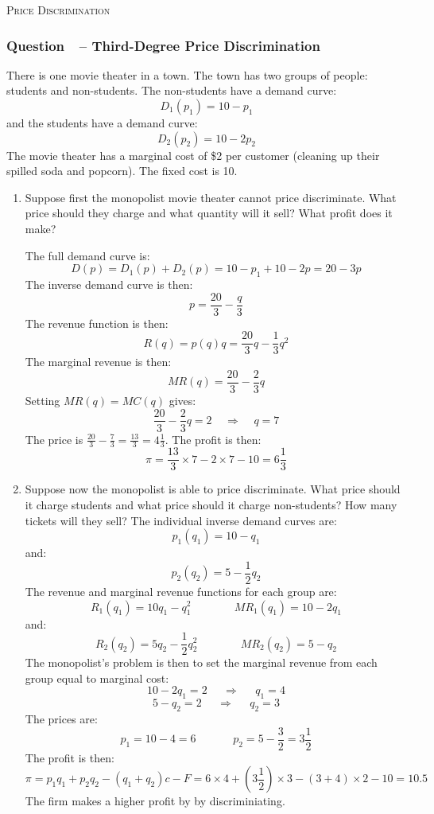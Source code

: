 \documentclass[12pt]{article}
\newcommand{\topic}[1]{\medskip\begin{center}\large\textsc{#1}\normalsize
  \end{center}}
\newcounter{question}[section]
\newcommand{\question}[1]{\refstepcounter{question}
  \subsubsection*{Question~\thequestion~-- #1}}
\newenvironment{subquestions}{
  \begin{enumerate}[label=(\roman*)]}{\end{enumerate}}
\begin{document}
\topic{Price Discrimination}

\question{Third-Degree Price Discrimination}
There is one movie theater in a town. The town has two groups of people:
students and non-students. The non-students have a demand curve:
\[
  D_1\left( p_1\right) = 10-p_1
\]
and the students have a demand curve:
\[
  D_2\left( p_2 \right) = 10 - 2p_2
\]
The movie theater has a marginal cost of \$2 per customer (cleaning up their
spilled soda and popcorn). The fixed cost is 10.
\begin{subquestions}
  \item Suppose first the monopolist movie theater cannot price discriminate.
    What price should they charge and what quantity will it sell? What
    profit does it make?

    \textcolor{solution-color}{
      The full demand curve is:
      \[
        D\left( p\right)=D_1\left( p \right)+D_2\left( p \right)=10-p_1 + 10 -
        2p = 20-3p
      \]
      The inverse demand curve is then:
      \[
        p=\frac{20}{3}-\frac{q}{3}
      \]
      The revenue function is then:
      \[
        R\left( q \right)=p\left( q \right)q=\frac{20}{3}q -
        \frac{1}{3}q^2
      \]
      The marginal revenue is then:
      \[
        MR\left( q \right)=\frac{20}{3}-\frac{2}{3}q
      \]
      Setting $MR\left( q \right)=MC\left( q \right)$ gives:
      \[
        \frac{20}{3}-\frac{2}{3}q=2 \;\;\;\;\Longrightarrow \;\;\;\;
        q = 7
      \]
      The price is
      $\frac{20}{3}-\frac{7}{3}=\frac{13}{3}=4\frac{1}{3}$.
      The profit is then:
      \[
        \pi=\frac{13}{3}\times 7  - 2\times 7 - 10 = 6\frac{1}{3}
      \]
    }
  \item Suppose now the monopolist is able to price discriminate. What price
    should it charge students and what price should it charge non-students?
    How many tickets will they sell?
    \textcolor{solution-color}{
      The individual inverse demand curves are:
      \[
        p_1\left( q_1 \right)=10-q_1
      \]
      and:
      \[
        p_2\left( q_2 \right)=5-\frac{1}{2}q_2
      \]
      The revenue and marginal revenue functions for each group are:
      \[
        R_1\left( q_1 \right)=10q_1-q_1^2 \;\;\;\;\;\;\;\;\;\;\;\;\;\;
        MR_1\left( q_1 \right)=10-2q_1
      \]
      and:
      \[
        R_2\left( q_2 \right)=5q_2-\frac{1}{2}q^2_2 \;\;\;\;\;\;\;\;\;\;\;\;\;\;
        MR_2\left( q_2 \right)=5 - q_2
      \]
      The monopolist's problem is then to set the marginal revenue from each
      group equal to marginal cost:
      \[
        10-2q_1=2 \;\;\;\;\; \Longrightarrow\;\;\;\;\;  q_1 = 4
      \]
      \[
        5-q_2=2 \;\;\;\;\; \Longrightarrow\;\;\;\;\;  q_2 = 3
      \]
      The prices are:
      \[
        p_1=10-4=6 \;\;\;\;\;\;\;\;\;\;\;\; p_2 =
        5-\frac{3}{2}=3\frac{1}{2}
      \]
      The profit is then:
      \[
        \pi= p_1q_1 + p_2q_2 - \left( q_1+q_2 \right)c - F=6\times 4 + \left(
        3\frac{1}{2} \right)\times 3 - \left( 3+4 \right)\times 2 - 10=10.5
      \]
      The firm makes a higher profit by by discriminiating.
    }
\end{subquestions}
\end{document}

